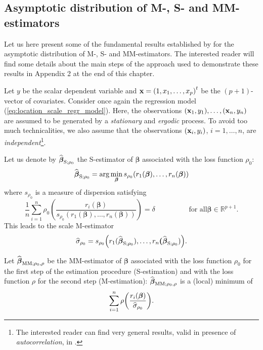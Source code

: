 \subsection{Asymptotic distribution of M-, S- and MM-estimators}
\label{subsec:asymptotic_distr_M_S_MM_estimators}

Let us here present some of the fundamental results established by \citet{Croux:2003}
for the asymptotic distribution of M-, S- and
MM-estimators. The interested reader will find some details about the main
steps of the approach used to demonstrate these results in Appendix 2 at the
end of this chapter.

Let $y$ be the scalar dependent variable and $\stvec{x}=\left(
1,x_{1},\ldots,x_{p}\right)  ^{t}$ be the $\left(  p+1\right)  $-vector of
covariates. Consider once again the regression model
(\ref{eq:location_scale_regr_model}). Here, the observations $\left(
\stvec{x}_{1},y_{1}\right)  ,\ldots,\left(  \stvec{x}_{n},y_{n}\right)  $
are assumed to be generated by a \emph{stationary} and \emph{ergodic} process.
To avoid too much technicalities, we also assume that the observations
$\left(  \stvec{x}_{i},y_{i}\right)  $, $i = 1, \dots, n$, are
\emph{independent}\footnote{The interested reader can find very general
results, valid in presence of \emph{autocorrelation}, in
\citet{Croux:2003}.}.

Let us denote by $\widehat{\boldsymbol\beta}_{\mathrm{S};\rho_{0}}$ the
S-estimator of $\boldsymbol\beta$ associated with the loss function
$\rho_{0}$:%
\[
\sthat{\boldsymbol\beta}_{\mathrm{S};\rho_{0}}=\arg\min_{\boldsymbol{\beta
}}s_{\rho_{0}}\left(  r_{1}\left(  \boldsymbol\beta\right)  ,\ldots
,r_{n}\left(  \boldsymbol\beta\right)  \right)
\]
where $s_{\rho_{0}}$ is a measure of dispersion satisfying%
\[
\frac{1}{n}\sum_{i=1}^{n}\rho_{0}\left(  \frac{r_{i}\left(  \boldsymbol{\beta
}\right)  }{s_{\rho_{0}}\left(  r_{1}(\boldsymbol\beta),\ldots
,r_{n}(\boldsymbol\beta)\right)  }\right)  =\delta\hspace{2cm}\text{for all
}\boldsymbol\beta\in\mathbb{R}^{p+1}.
\]
This leads to the scale M-estimator%
\[
\sthat{\sigma}_{\rho_{0}}=s_{\rho_{0}}\left(  r_{1}(\widehat
{\boldsymbol\beta}_{\mathrm{S};\rho_{0}}),\ldots,r_{n}\boldsymbol{(}%
\sthat{\boldsymbol\beta}_{\mathrm{S};\rho_{0}})\right)  .
\]


Let $\widehat{\boldsymbol\beta}_{\mathrm{MM};\rho_{0},\rho}$ be the
MM-estimator of $\boldsymbol\beta$ associated with the loss function
$\rho_{0}$ for the first step of the estimation procedure (S-estimation) and
with the loss function $\rho$ for the second step (M-estimation):
$\widehat{\boldsymbol\beta}_{\mathrm{MM};\rho_{0},\rho}$ is a (local)
minimum of
\[
\sum_{i=1}^{n}\rho\left(  \frac{r_{i}\left(  \boldsymbol\beta\right)
}{\sthat{\sigma}_{\rho_{0}}}\right)  .
\]


